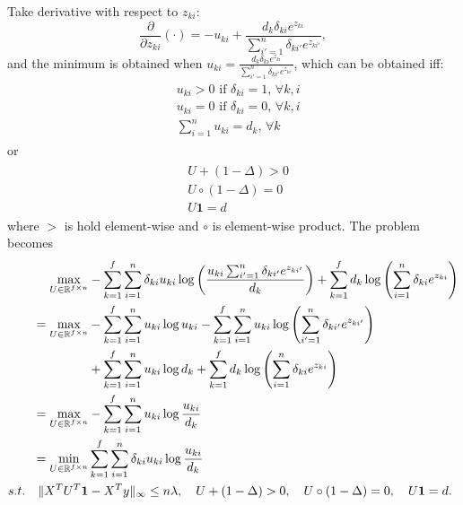 Take derivative with respect to $z_{ki}$:
\begin{equation}
    \label{eq:partialz}
    \frac{\partial}{\partial z_{ki}}(\cdot)=-u_{ki}+\frac{d_k\delta_{ki}e^{z_{ki}}}{\sum_{i'=1}^n \delta_{ki'} e^{z_{ki'}}},
\end{equation}
and the minimum is obtained when $u_{ki}=\frac{d_k\delta_{ki}e^{z_{ki}}}{\sum_{i'=1}^n \delta_{ki'} e^{z_{ki'}}}$, which can be obtained iff:
\begin{gather}
    \label{eq:constu1}
    \begin{aligned}
    &u_{ki} > 0\textrm{ if }\delta_{ki}=1,\,\forall k,i\\
    &u_{ki}=0\textrm{ if }\delta_{ki}=0,\,\forall k,i\\
    &\sum_{i=1}^n u_{ki}=d_k,\,\forall k
\end{aligned}
\end{gather}
or
\begin{gather}
    \label{eq:constu2}
    \begin{aligned}
    &U+(1-\Delta)>0\\
    &U\circ(1-\Delta)=0\\
    &U\mathbf{1}=d
\end{aligned}
\end{gather}
where $>$ is hold element-wise and $\circ$ is element-wise product. The problem becomes
\begin{gather}
    \label{eq:dualu}
    \begin{aligned}
        \underset{U\in \mathbb{R}^{f\times n}}{\mathrm{max}}&-\sum_{k=1}^f\sum_{i=1}^n\delta_{ki}u_{ki}\log\left(\frac{u_{ki}\sum_{i'=1}^n \delta_{ki'} e^{z_{ki'}}}{d_k}\right)+\sum_{k=1}^fd_k\log\left(\sum_{i=1}^n \delta_{ki} e^{z_{ki}}\right)\\
        =\underset{U\in \mathbb{R}^{f\times n}}{\mathrm{max}}&-\sum_{k=1}^f\sum_{i=1}^nu_{ki}\log u_{ki}-\sum_{k=1}^f\sum_{i=1}^nu_{ki}\log\left(\sum_{i'=1}^n \delta_{ki'} e^{z_{ki'}}\right)\\
        &+\sum_{k=1}^f\sum_{i=1}^nu_{ki}\log d_k+\sum_{k=1}^fd_k\log\left(\sum_{i=1}^n \delta_{ki} e^{z_{ki}}\right)\\
        =\underset{U\in \mathbb{R}^{f\times n}}{\mathrm{max}}&-\sum_{k=1}^f\sum_{i=1}^nu_{ki}\log\frac{u_{ki}}{d_k}\\
        =\underset{U\in \mathbb{R}^{f\times n}}{\mathrm{min}}&\sum_{k=1}^f\sum_{i=1}^n\delta_{ki}u_{ki}\log\frac{u_{ki}}{d_k}\\
        s.t.\quad \lVert X^TU^T\mathbf{1}&-X^Ty\rVert_\infty\leq n\lambda,\quad U+(1-\Delta)>0,\quad U\circ(1-\Delta)=0,\quad U\mathbf{1}=d.
    \end{aligned}
\end{gather}


